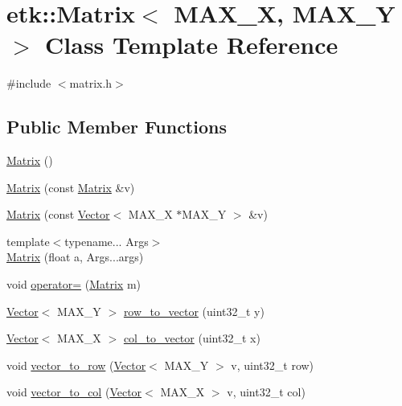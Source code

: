 \hypertarget{classetk_1_1_matrix}{\section{etk\-:\-:Matrix$<$ M\-A\-X\-\_\-\-X, M\-A\-X\-\_\-\-Y $>$ Class Template Reference}
\label{classetk_1_1_matrix}
}


{\ttfamily \#include $<$matrix.\-h$>$}

\subsection*{Public Member Functions}
\begin{DoxyCompactItemize}
\item 
\hyperlink{classetk_1_1_matrix_a1340cc17dcd847ee988c8dee72c32565}{Matrix} ()
\item 
\hyperlink{classetk_1_1_matrix_a0242991f55f1e1696e59ea79831d3209}{Matrix} (const \hyperlink{classetk_1_1_matrix}{Matrix} \&v)
\item 
\hyperlink{classetk_1_1_matrix_a5a291855a1c2bf5f83c151a2dbfc6c15}{Matrix} (const \hyperlink{classetk_1_1_vector}{Vector}$<$ M\-A\-X\-\_\-\-X $\ast$M\-A\-X\-\_\-\-Y $>$ \&v)
\item 
{\footnotesize template$<$typename... Args$>$ }\\\hyperlink{classetk_1_1_matrix_a69555e8311fc0e7fd20a8e51e0fe48f6}{Matrix} (float a, Args...\-args)
\item 
void \hyperlink{classetk_1_1_matrix_a31163e3aba16e2becc41e9b6810aaf56}{operator=} (\hyperlink{classetk_1_1_matrix}{Matrix} m)
\item 
\hyperlink{classetk_1_1_vector}{Vector}$<$ M\-A\-X\-\_\-\-Y $>$ \hyperlink{classetk_1_1_matrix_a9e8537e95c1d901e32e70a93f12b63d4}{row\-\_\-to\-\_\-vector} (uint32\-\_\-t y)
\item 
\hyperlink{classetk_1_1_vector}{Vector}$<$ M\-A\-X\-\_\-\-X $>$ \hyperlink{classetk_1_1_matrix_a45c037788065b738e9e09c87280f4d07}{col\-\_\-to\-\_\-vector} (uint32\-\_\-t x)
\item 
void \hyperlink{classetk_1_1_matrix_afd0607137dafdf4aefbd4323f192b5df}{vector\-\_\-to\-\_\-row} (\hyperlink{classetk_1_1_vector}{Vector}$<$ M\-A\-X\-\_\-\-Y $>$ v, uint32\-\_\-t row)
\item 
void \hyperlink{classetk_1_1_matrix_a4c975ee52094e0f8dc379a39a7a310f4}{vector\-\_\-to\-\_\-col} (\hyperlink{classetk_1_1_vector}{Vector}$<$ M\-A\-X\-\_\-\-X $>$ v, uint32\-\_\-t col)

\end{DoxyCompactItemize}
